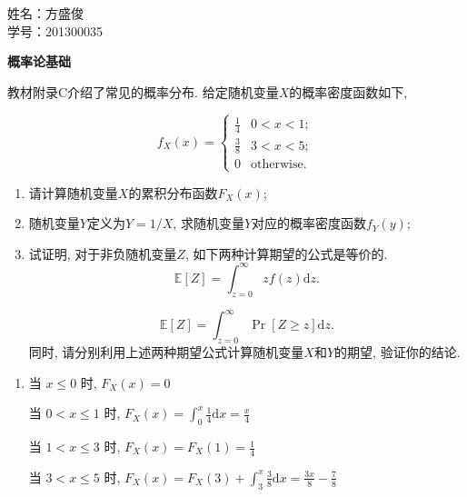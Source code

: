 \documentclass[answers]{exam}  %
\begin{document}
\Large
\noindent
姓名：方盛俊 \\
学号：201300035 \\
\begin{questions}
  \question [30] \textbf{概率论基础}

  教材附录C介绍了常见的概率分布.
  给定随机变量$X$的概率密度函数如下,

  \begin{equation}
    f_X(x) =
    \begin{cases}
      \frac{1}{4} & 0<x<1;            \\
      \frac{3}{8} & 3<x<5;            \\
      0           & \mbox{otherwise.}
    \end{cases}
  \end{equation}

  \begin{enumerate}
    \item  请计算随机变量$X$的累积分布函数$F_X(x)$;
    \item  随机变量$Y$定义为$Y = 1/X$, 求随机变量$Y$对应的概率密度函数$f_Y(y)$;
    \item  试证明, 对于非负随机变量$Z$, 如下两种计算期望的公式是等价的.
          \begin{equation}
            \label{ch1-eq-expect-1}
            \mathbb{E}[Z] = \int_{z=0}^{\infty}zf(z) \mathrm{d} z.
          \end{equation}

          \begin{equation}
            \label{ch1-eq-expect-2}
            \mathbb{E}[Z] = \int_{z=0}^{\infty}\Pr[Z\geq z] \mathrm{d} z.
          \end{equation}
          同时, 请分别利用上述两种期望公式计算随机变量$X$和$Y$的期望, 验证你的结论.
  \end{enumerate}
  \begin{solution}
    \begin{enumerate}
      \item 当 $x \le 0$ 时, $F_{X}(x) = 0$

            当 $0 < x \le 1$ 时, $\displaystyle F_{X}(x) = \int_{0}^{x} \frac{1}{4} \mathrm{d}x = \frac{x}{4}$

            当 $1 < x \le 3$ 时, $\displaystyle F_{X}(x) = F_{X}(1) = \frac{1}{4}$

            当 $3 < x \le 5$ 时, $\displaystyle F_{X}(x) = F_{X}(3) + \int_{3}^{x} \frac{3}{8} \mathrm{d}x = \frac{3 x}{8} - \frac{7}{8}$


\end{enumerate}
\end{solution}
\end{questions}
\end{document}
